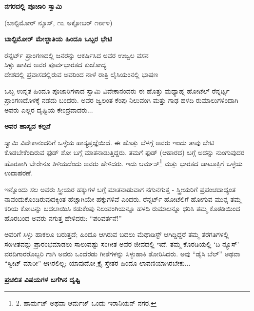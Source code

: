 \begin{center}
\textbf{ನಗರದಲ್ಲಿ ಪೂಜಾರಿ ಸ್ವಾಮಿ}
\end{center}

\begin{center}
(ಬಾಲ್ಟಿಮೋರ್ ನ್ಯೂಸ್, ೧೩ ಅಕ್ಟೋಬರ್ ೧೮೯೪)
\end{center}

\begin{center}
\textbf{ಬಾಲ್ಟಿಮೋರ್ ಮೇಲ್ಜಾತಿಯ ಹಿಂದೂ ಒಬ್ಬರ ಭೇಟಿ}
\end{center}

\begin{center}
ರೆನ್ನರ್ಟ್ ಪ್ರಾಂಗಣದಲ್ಲಿ ಜನರನ್ನು ಆಕರ್ಷಿಸಿದ ಅವರ ಉಜ್ವಲ ವಸನ\\ಸಿಳ್ಳು ಹಾಕಿದ ಅವರ ಪೂರ್ವಭಾರತದ ಕುಚೋದ್ಯ\\ದೇಶದಲ್ಲಿ ಪ್ರವಾಸದಲ್ಲಿರುವ ಅವರಿಂದ ನಾಳೆ ರಾತ್ರಿ ಲೈಸಿಯಂನಲ್ಲಿ ಭಾಷಣ
\end{center}

ಒಬ್ಬ ಉನ್ನತ ಹಿಂದೂ ಪೂಜಾರಿಗಳಾದ ಸ್ವಾಮಿ ವಿವೇಕಾನಂದರು ಈ ಹೊತ್ತು ಮಧ್ಯಾಹ್ನ ಹೋಟೆಲ್ ರೆನ್ನರ್ಟ್ನ ಪ್ರಾಂಗಣದೊಳಕ್ಕೆ ನಡೆದು ಬಂದರು. ಅವರ ಜ್ವಲಂತ ಕೆಂಪು ನಿಲುವಂಗಿ ಮತ್ತು ಗಾಢ ಹಳದಿ ರುಮಾಲುಗಳಿಂದಾಗಿ ಅವರು ಎಲ್ಲರ ದೃಷ್ಟಿಯ ಕೇಂದ್ರವಾದರು...

\begin{center}
\textbf{ಅವರ ಹಾಸ್ಯದ ಕಲ್ಪನೆ}
\end{center}

ಸ್ವಾಮಿ ವಿವೇಕಾನಂದರಿಗೆ ಒಳ್ಳೆಯ ಹಾಸ್ಯಪ್ರಜ್ಞೆಯಿದೆ. ಈ ಹೊತ್ತು ಬೆಳಗ್ಗೆ ಅವರು ಇಂದು ತಾವು ಭೇಟಿ ಕೊಡಬೇಕೆಂದಿರುವ ಫುಡ್ ಶೋ ಬಗ್ಗೆ ಮಾತನಾಡುತ್ತಿದ್ದರು. ತಮಗೆ ಫುಡ್ (ಆಹಾರದ) ಬಗ್ಗೆ ಅದನ್ನು ನುಂಗುವುದರ ಹೊರತಾಗಿ ಬೇರೇನೂ ತಿಳಿಯದೆಂದು ಅವರು ಹೇಳಿದರು. ಇದು ಆರ್ಮಸ್\footnote{2. ಹಾರ್ಮಜ್ ಅಥವಾ ಆರ್ಮಜ್ ಒಂದು ಇರಾನಿಯನ್ ನಗರ.} ಮತ್ತು ಭಾರತದ ಚಾಟೂಕ್ತಿಗೆ ಒಳ್ಳೆಯ ಉದಾಹರಣೆ.

ಇನ್ನೊಂದು ಸಲ ಅವರು ಸ್ತ್ರೀಯರ ಹಕ್ಕುಗಳ ಬಗ್ಗೆ ಮಾತನಾಡುವಾಗ ನಗುನಗುತ್ತ - ಸ್ತ್ರೀಯರಿಗೆ ಪ್ರಪಂಚದಾದ್ಯಂತ ನಾವಂದುಕೊಂಡಿರುವುದಕ್ಕಿಂತ ಹೆಚ್ಚಾಗಿಯೇ ಹಕ್ಕುಗಳಿವೆ ಎಂದರು. ರೆನ್ನರ್ಟ್ ಹೋಟೆಲಿಗೆ ಹೋಗುವ ಮುನ್ನ ತಮ್ಮ ಕರಿಯ ಕೋಟನ್ನು ಬದಲಾಯಿಸಿ ಕಡುಕೆಂಪು ನಿಲುವಂಗಿಯನ್ನೂ ಹಳದಿ ರುಮಾಲನ್ನೂ ಧರಿಸಿ ತಮ್ಮ ಕೊಠಡಿಯಿಂದ ಹೊರಬಂದ ಅವರು ನಗುತ್ತ ಹೇಳಿದರು: “ಪರಿವರ್ತನೆ!”

ಅವರಿಗೆ ಸಿಳ್ಳು ಹಾಕಲೂ ಬರುತ್ತದೆ; ಹಿಂದೂ ಆಗಿರುವ ಬದಲು ಮೆಥಾಡಿಸ್ಟ್ ಆಗಿದ್ದಿದ್ದರೆ ತಮ್ಮ ತರಗತಿಗಳಲ್ಲಿ ಸಂಗೀತವನ್ನು ಪ್ರಾರಂಭಮಾಡಲು ಸಾಲುವಷ್ಟು ಸಂಗೀತ ಅವರ ಜೀವದಲ್ಲಿ ಇದೆ. ತಮ್ಮ ಕೊಠಡಿಯಲ್ಲಿ ‘ದಿ ನ್ಯೂಸ್’ ವರದಿಗಾರರೊಬ್ಬರಿ ಗಾಗಿ ಅವರು ಒಂದೆರಡು ಗೀತೆಗಳನ್ನು ಸಿಳ್ಳುಹಾಕಿ ತೋರಿಸಿದರು. ಅವು “ಡೈಸಿ ಬೆಲ್” ಅಥವಾ “ಸ್ವೀಟ್ ಮಾರೀ” ಆಗಿರಲಿಲ್ಲ; ಯಾವುದೋ ಕ್ರೈ ಸ್ತೇತರ ಹಿಂದೂ ಲಾವಣಿಯಾಗಿರಬೇಕು...

\begin{center}
\textbf{ಪ್ರಚಲಿತ ವಿಷಯಗಳ ಬಗೆಗಿನ ದೃಷ್ಟಿ}
\end{center}

